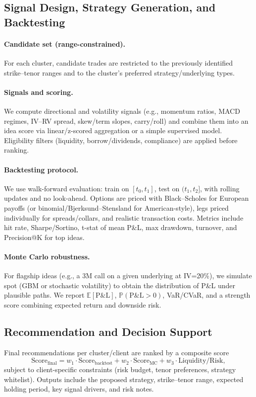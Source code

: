 \documentclass[12pt,a4paper]{report}
\begin{document}
\subsection{Signal Design, Strategy Generation, and Backtesting}
\paragraph{Candidate set (range-constrained).}
For each cluster, candidate trades are restricted to the previously identified strike--tenor ranges and to the cluster's preferred strategy/underlying types.

\paragraph{Signals and scoring.}
We compute directional and volatility signals (e.g., momentum ratios, MACD regimes, IV--RV spread, skew/term slopes, carry/roll) and combine them into an idea score via linear/z-scored aggregation or a simple supervised model. Eligibility filters (liquidity, borrow/dividends, compliance) are applied before ranking.

\paragraph{Backtesting protocol.}
We use walk-forward evaluation: train on $[t_0, t_1]$, test on $(t_1, t_2]$, with rolling updates and no look-ahead. Options are priced with Black--Scholes for European payoffs (or binomial/Bjerksund--Stensland for American-style), legs priced individually for spreads/collars, and realistic transaction costs. Metrics include hit rate, Sharpe/Sortino, t-stat of mean P\&L, max drawdown, turnover, and Precision@K for top ideas.

\paragraph{Monte Carlo robustness.}
For flagship ideas (e.g., a 3M call on a given underlying at IV=20\%), we simulate spot (GBM or stochastic volatility) to obtain the distribution of P\&L under plausible paths. We report $\mathbb{E}[\text{P\&L}]$, $\mathbb{P}(\text{P\&L}>0)$, VaR/CVaR, and a strength score combining expected return and downside risk.

\subsection{Recommendation and Decision Support}
Final recommendations per cluster/client are ranked by a composite score
\[
\text{Score}_{\text{final}} = w_1 \cdot \text{Score}_{\text{backtest}} + w_2 \cdot \text{Score}_{\text{MC}} + w_3 \cdot \text{Liquidity/Risk},
\]
subject to client-specific constraints (risk budget, tenor preferences, strategy whitelist). Outputs include the proposed strategy, strike--tenor range, expected holding period, key signal drivers, and risk notes.
\end{document}
